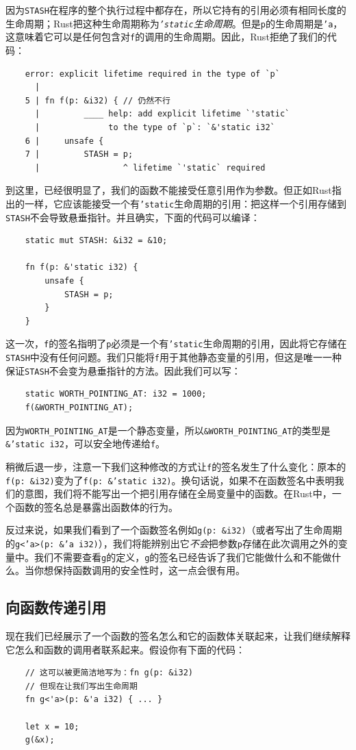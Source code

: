 因为\texttt{STASH}在程序的整个执行过程中都存在，所以它持有的引用必须有相同长度的生命周期；Rust把这种生命周期称为\emph{\texttt{'static}生命周期}。但是\texttt{p}的生命周期是\texttt{'a}，这意味着它可以是任何包含对\texttt{f}的调用的生命周期。因此，Rust拒绝了我们的代码：
\begin{verbatim}
    error: explicit lifetime required in the type of `p`
      |
    5 | fn f(p: &i32) { // 仍然不行
      |         ____ help: add explicit lifetime `'static`
      |              to the type of `p`: `&'static i32`
    6 |     unsafe {
    7 |         STASH = p;
      |                 ^ lifetime `'static` required
\end{verbatim}

到这里，已经很明显了，我们的函数不能接受任意引用作为参数。但正如Rust指出的一样，它应该能接受一个有\texttt{'static}生命周期的引用：把这样一个引用存储到\texttt{STASH}不会导致悬垂指针。并且确实，下面的代码可以编译：
\begin{verbatim}
    static mut STASH: &i32 = &10;

    fn f(p: &'static i32) {
        unsafe {
            STASH = p;
        }
    }
\end{verbatim}

这一次，\texttt{f}的签名指明了\texttt{p}必须是一个有\texttt{'static}生命周期的引用，因此将它存储在\texttt{STASH}中没有任何问题。我们只能将\texttt{f}用于其他静态变量的引用，但这是唯一一种保证\texttt{STASH}不会变为悬垂指针的方法。因此我们可以写：
\begin{verbatim}
    static WORTH_POINTING_AT: i32 = 1000;
    f(&WORTH_POINTING_AT);
\end{verbatim}

因为\texttt{WORTH\_POINTING\_AT}是一个静态变量，所以\texttt{\&WORTH\_POINTING\_AT}的类型是\texttt{\&'static i32}，可以安全地传递给\texttt{f}。

稍微后退一步，注意一下我们这种修改的方式让\texttt{f}的签名发生了什么变化：原本的\texttt{f(p: \&i32)}变为了\texttt{f(p: \&'static i32)}。换句话说，如果不在函数签名中表明我们的意图，我们将不能写出一个把引用存储在全局变量中的函数。在Rust中，一个函数的签名总是暴露出函数体的行为。

反过来说，如果我们看到了一个函数签名例如\texttt{g(p: \&i32)}（或者写出了生命周期的\texttt{g<'a>(p: \&'a i32)}），我们将能辨别出它\emph{不会}把参数\texttt{p}存储在此次调用之外的变量中。我们不需要查看\texttt{g}的定义，\texttt{g}的签名已经告诉了我们它能做什么和不能做什么。当你想保持函数调用的安全性时，这一点会很有用。

\subsection{向函数传递引用}
现在我们已经展示了一个函数的签名怎么和它的函数体关联起来，让我们继续解释它怎么和函数的调用者联系起来。假设你有下面的代码：
\begin{verbatim}
    // 这可以被更简洁地写为：fn g(p: &i32)
    // 但现在让我们写出生命周期
    fn g<'a>(p: &'a i32) { ... }

    let x = 10;
    g(&x);
\end{verbatim}


